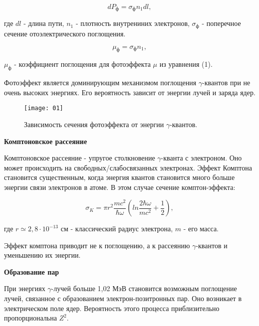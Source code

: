 \documentclass[letterpaper,12pt]{article}
\begin{document}
	\begin{equation}
	dP_\text{ф}=\sigma_\text{ф} n_1 dl,
	\end{equation}

	где $dl$ - длина пути, $n_1$ - плотность внутрениних  электронов, $\sigma_\text{ф}$ - поперечное сечение отоэлектрического поглощения.
	
	\begin{equation}
	\mu_\text{ф}=\sigma_\text{ф}n_1, 
	\end{equation}
	
	$\mu_\text{ф}$ - коэффициент поглощения для фотоэффекта $\mu$ из уравнения (1).
	
	Фотоэффект является доминирующим механизмом поглощения $\gamma$-квантов при не очень высоких энергиях. Его вероятность зависит от энергии лучей и заряда  ядер.
	
	
	\begin{figure}[h]
		\centering
		{\texttt{[image: 01]}}
		\caption{Зависимость сечения фотоэффекта от энергии $\gamma$-квантов.}
	\end{figure}
	
	
	\vspace{0.5cm}
\textbf{	Комптоновское рассеяние}


	Комптоновское рассеяние - упругое столкновение $\gamma$-кванта с электроном. Оно может происходить на свободных/слабосвязанных электронах. Эффект Комптона становится существенным, когда энергия квантов становится много больше энергии связи электронов в атоме. В этом случае сечение комптон-эффекта:
	
	\begin{equation}
	\sigma_K=\pi r^2 \dfrac{mc^2}{\hbar \omega}\left(ln\frac{2\hbar\omega}{mc^2}+\frac{1}{2}\right),
	\end{equation}
	
	где $r\simeq2,8\cdot10^{-13}$  см - классический радиус электрона, $m$ - его масса.
	
	Эффект комптона приводит не к поглощению, а к рассеянию $\gamma$-квантов и уменьшению их энергии.
	
	
	\vspace{0.5cm}
\textbf{	Образование пар}



	   При энергиях $\gamma$-лучей больше 1,02 МэВ становится возможным поглощение лучей, связанное с образованием электрон-позитронных пар. Оно возникает в электрическом поле ядер. Вероятность этого процесса приблизительно пропорциональна $Z^2$.
	   
\end{document}

